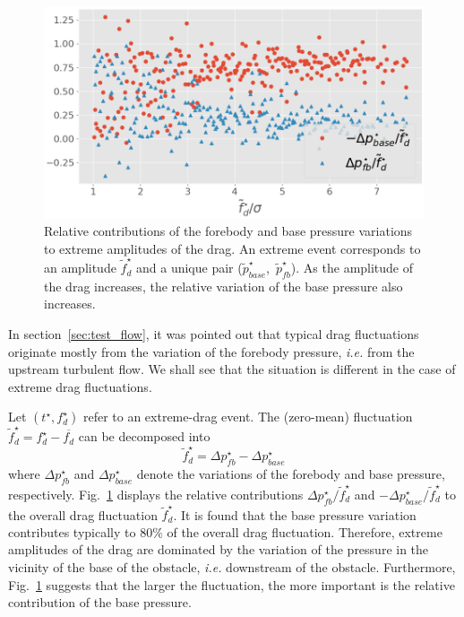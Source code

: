 \documentclass{jfm}
\newcommand{\EL}[1]{{\color{myred}{#1}}}
\begin{document}
\begin{figure}
	\centering
	\includegraphics[width=.8\linewidth]{pressure_ratio/pressure_ratio.png}
	\caption{\label{fig:pressure_ratio} Relative contributions of the forebody and base pressure variations to extreme amplitudes of the drag. An extreme event corresponds to an amplitude $\tilde f^{\star}_d$ and a unique pair  ($\tilde{p}^{\star}_{base}$,~$\tilde{p}^{\star}_{fb}$).
		As the amplitude of the drag increases, the relative variation of the base pressure also increases. \EL{The dotted lines represent a linear least-squares fitting of the relative pressure contributions as a function of the (normalized) drag.}
	}
\end{figure}

%
In section~\ref{sec:test_flow}, it was pointed out that typical drag fluctuations originate mostly from the variation of the forebody pressure, \textit{i.e.} from the upstream turbulent flow.
We shall see that the situation is different in the case of {extreme} drag fluctuations.

%
Let $(t^{\star}, f_d^{\star})$ refer to an extreme-drag event.
The (zero-mean) fluctuation $\tilde{f}_d^{\star} = f_d^{\star} - \overline{f_d}$ can be  decomposed into
\begin{equation}
\tilde{f}_d^{\star} = \Delta p_{fb}^{\star} - \Delta p_{base}^{\star}
\end{equation}
where $\Delta p_{fb}^{\star}$ and $\Delta p_{base}^{\star}$ denote the variations of the forebody and base pressure, respectively.
%
Fig.~\ref{fig:pressure_ratio} displays the relative contributions
$\Delta p_{fb}^{\star}/\tilde{f}_d^{\star}$ and $-\Delta p_{base}^{\star}/\tilde{f}_d^{\star}$ to the overall drag fluctuation $\tilde f_d^{\star}$.
%
It is found that the base pressure variation contributes typically to $80\%$ of the overall drag fluctuation.
Therefore, extreme amplitudes of the drag are dominated by the variation of the pressure in the vicinity of the base of the obstacle, \emph{i.e.} downstream of the obstacle.
Furthermore, Fig.~\ref{fig:pressure_ratio} suggests that the larger the fluctuation, the more important is the relative contribution of the base pressure.
\end{document}
